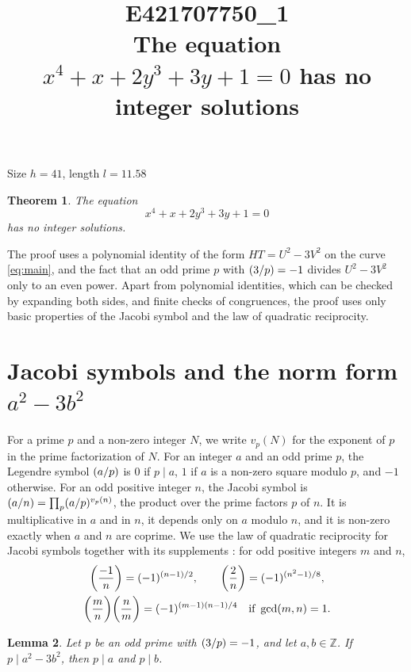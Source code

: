 \documentclass[11pt]{article}
\title{\textbf{E421707750\_1}\\[4pt] {\Large The equation $x^{4}+x+2y^{3}+3y+1=0$ has no integer solutions}}
\author{}
\date{}
\newtheorem{theorem}{Theorem}
\newtheorem{lemma}[theorem]{Lemma}
\newcommand{\Z}{\mathbb{Z}}
\newcommand{\leg}[2]{\mathchoice{\biggl(\dfrac{#1}{#2}\biggr)}{(#1/#2)}{(#1/#2)}{(#1/#2)}}
\begin{document}
\maketitle
\vspace{-8ex}
\begin{center}
Size $h=41$, length $l=11.58$
\end{center}

\begin{theorem}\label{thm:main}
The equation
\begin{equation}\label{eq:main}
x^{4}+x+2y^{3}+3y+1=0
\end{equation}
has no integer solutions.
\end{theorem}

The proof uses a polynomial identity of the form $HT=U^2-3V^2$ on the curve \eqref{eq:main}, and the fact that an odd prime $p$ with $\leg{3}{p}=-1$ divides $U^2-3V^2$ only to an even power. Apart from polynomial identities, which can be checked by expanding both sides, and finite checks of congruences, the proof uses only basic properties of the Jacobi symbol and the law of quadratic reciprocity.

\section{\texorpdfstring{Jacobi symbols and the norm form $a^2-3b^2$}{Jacobi symbols and the norm form}}

For a prime $p$ and a non-zero integer $N$, we write $v_p(N)$ for the exponent of $p$ in the prime factorization of $N$. For an integer $a$ and an odd prime $p$, the Legendre symbol $\leg{a}{p}$ is $0$ if $p\mid a$, $1$ if $a$ is a non-zero square modulo $p$, and $-1$ otherwise. For an odd positive integer $n$, the Jacobi symbol is $\leg{a}{n}=\prod_p\leg{a}{p}^{v_p(n)}$, the product over the prime factors $p$ of $n$. It is multiplicative in $a$ and in $n$, it depends only on $a$ modulo $n$, and it is non-zero exactly when $a$ and $n$ are coprime. We use the law of quadratic reciprocity for Jacobi symbols together with its supplements \cite[Chapter~5, \S2]{IR}: for odd positive integers $m$ and $n$,
\begin{gather*}
\leg{-1}{n}=(-1)^{(n-1)/2},\qquad\leg{2}{n}=(-1)^{(n^2-1)/8},\\
\leg{m}{n}\leg{n}{m}=(-1)^{(m-1)(n-1)/4}\quad\text{if }\gcd(m,n)=1.
\end{gather*}

\begin{lemma}\label{lem:divides}
Let $p$ be an odd prime with $\leg{3}{p}=-1$, and let $a,b\in\Z$. If $p\mid a^2-3b^2$, then $p\mid a$ and $p\mid b$.
\end{lemma}
\end{document}
